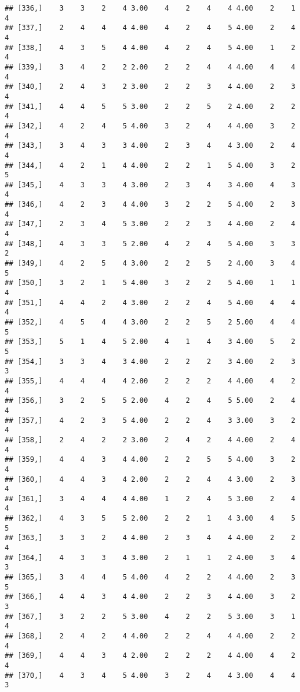 \documentclass[]{article}
\begin{document}
\begin{verbatim}
## [336,]    3    3    2    4 3.00    4    2    4    4 4.00    2    1    4
## [337,]    2    4    4    4 4.00    4    2    4    5 4.00    2    4    4
## [338,]    4    3    5    4 4.00    4    2    4    5 4.00    1    2    4
## [339,]    3    4    2    2 2.00    2    2    4    4 4.00    4    4    4
## [340,]    2    4    3    2 3.00    2    2    3    4 4.00    2    3    4
## [341,]    4    4    5    5 3.00    2    2    5    2 4.00    2    2    4
## [342,]    4    2    4    5 4.00    3    2    4    4 4.00    3    2    4
## [343,]    3    4    3    3 4.00    2    3    4    4 3.00    2    4    4
## [344,]    4    2    1    4 4.00    2    2    1    5 4.00    3    2    5
## [345,]    4    3    3    4 3.00    2    3    4    3 4.00    4    3    4
## [346,]    4    2    3    4 4.00    3    2    2    5 4.00    2    3    4
## [347,]    2    3    4    5 3.00    2    2    3    4 4.00    2    4    4
## [348,]    4    3    3    5 2.00    4    2    4    5 4.00    3    3    2
## [349,]    4    2    5    4 3.00    2    2    5    2 4.00    3    4    5
## [350,]    3    2    1    5 4.00    3    2    2    5 4.00    1    1    4
## [351,]    4    4    2    4 3.00    2    2    4    5 4.00    4    4    4
## [352,]    4    5    4    4 3.00    2    2    5    2 5.00    4    4    5
## [353,]    5    1    4    5 2.00    4    1    4    3 4.00    5    2    5
## [354,]    3    3    4    3 4.00    2    2    2    3 4.00    2    3    3
## [355,]    4    4    4    4 2.00    2    2    2    4 4.00    4    2    4
## [356,]    3    2    5    5 2.00    4    2    4    5 5.00    2    4    4
## [357,]    4    2    3    5 4.00    2    2    4    3 3.00    3    2    4
## [358,]    2    4    2    2 3.00    2    4    2    4 4.00    2    4    4
## [359,]    4    4    3    4 4.00    2    2    5    5 4.00    3    2    4
## [360,]    4    4    3    4 2.00    2    2    4    4 3.00    2    3    4
## [361,]    3    4    4    4 4.00    1    2    4    5 3.00    2    4    4
## [362,]    4    3    5    5 2.00    2    2    1    4 3.00    4    5    5
## [363,]    3    3    2    4 4.00    2    3    4    4 4.00    2    2    4
## [364,]    4    3    3    4 3.00    2    1    1    2 4.00    3    4    3
## [365,]    3    4    4    5 4.00    4    2    2    4 4.00    2    3    5
## [366,]    4    4    3    4 4.00    2    2    3    4 4.00    3    2    3
## [367,]    3    2    2    5 3.00    4    2    2    5 3.00    3    1    4
## [368,]    2    4    2    4 4.00    2    2    4    4 4.00    2    2    4
## [369,]    4    4    3    4 2.00    2    2    2    4 4.00    4    2    4
## [370,]    4    3    4    5 4.00    3    2    4    4 3.00    4    4    3

\end{verbatim}
\end{document}
